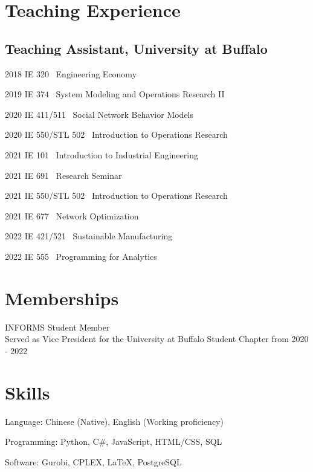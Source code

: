 \documentclass[12pt,letterpaper]{report}
\newcommand{\listitemspace}{0.25em}
\renewenvironment{itemize}
{\begin{list}{}{\setlength{\leftmargin}{0em}
                \setlength{\parskip}{0em}
                \setlength{\itemsep}{\listitemspace}
                \setlength{\parsep}{\listitemspace}}}
{\end{list}}
\begin{document}
    \section*{Teaching Experience}
    \subsection*{Teaching Assistant, University at Buffalo}
    \begin{tablist}
        \item[2018] \tab{} IE 320 \ Engineering Economy
        \item[2019] \tab{} IE 374 \ System Modeling and Operations Research II
        \item[2020] \tab{} IE 411/511 \ Social Network Behavior Models
        \item[2020] \tab{} IE 550/STL 502 \ Introduction to Operations Research
        \item[2021] \tab{} IE 101 \ Introduction to Industrial Engineering
        \item[2021] \tab{} IE 691 \ Research Seminar
        \item[2021] \tab{} IE 550/STL 502 \ Introduction to Operations Research
        \item[2021] \tab{} IE 677 \ Network Optimization
        \item[2022] \tab{} IE 421/521 \ Sustainable Manufacturing
        \item[2022] \tab{} IE 555 \ Programming for Analytics
    \end{tablist}

    \section*{Memberships}
    \begin{itemize}
        \item INFORMS Student Member\\
        Served as Vice President for the University at Buffalo Student Chapter from 2020 - 2022
    \end{itemize}

    \section*{Skills}
    \begin{itemize}
        \item Language: Chinese (Native), English (Working proficiency)
        \item Programming: Python, C\#, JavaScript, HTML/CSS, SQL
        \item Software: Gurobi, CPLEX, LaTeX, PostgreSQL
    \end{itemize}
\end{document}
